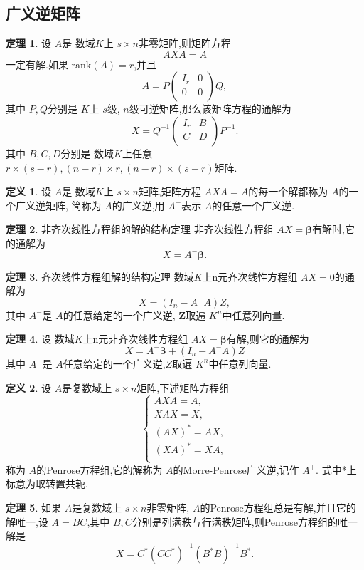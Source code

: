 \documentclass[a4paper,11pt]{article}%
\theoremstyle{remark}
\theoremstyle{definition}
\newtheorem{theorem}{定理}[section]
\theoremstyle{definition}
\newtheorem*{definition}{定义}
\theoremstyle{plain}
\begin{document}
\subsection{广义逆矩阵}
\begin{theorem}
    设 $A$是 数域$K$上 $s\times n$非零矩阵,则矩阵方程
    \[AXA=A\]
    一定有解.如果 $\text{rank}(A)=r$,并且
    \[A=P\begin{pmatrix}
        I_r&0\\
        0&0\\
    \end{pmatrix}Q,\]
    其中 $P,Q$分别是 $K$上 $s$级, $n$级可逆矩阵,那么该矩阵方程的通解为
    \[X=Q^{-1}\begin{pmatrix}
        I_r&B\\
        C&D\\
    \end{pmatrix}
    P^{-1}.\]
    其中 $B,C,D$分别是 数域$K$上任意 $r\times (s-r),(n-r)\times r,(n-r)\times (s-r)$矩阵.
\end{theorem}
\begin{definition}
    设 $A$是 数域$K$上 $s\times n$矩阵,矩阵方程 $AXA=A$的每一个解都称为 $A$的一个广义逆矩阵,
    简称为 $A$的广义逆,用 $A^-$表示 $A$的任意一个广义逆.
\end{definition}
\begin{theorem}{非齐次线性方程组的解的结构定理}
   非齐次线性方程组 $AX=\bm{\beta}$有解时,它的通解为
   \[X=A^-\bm{\beta}.\] 
\end{theorem}
\begin{theorem}{齐次线性方程组解的结构定理}
    数域$K$上n元齐次线性方程组 $AX=0$的通解为
    \[X=(I_n-A^-A)Z,\]
    其中 $A^-$是 $A$的任意给定的一个广义逆, $\mathbf{Z}$取遍 $K^n$中任意列向量.
\end{theorem}
\begin{theorem}
    设 数域$K$上n元非齐次线性方程组 $AX=\bm{\beta}$有解,则它的通解为
    \[X=A^-\bm{\beta}+(I_n-A^-A)Z\]
    其中 $A^-$是 $A$任意给定的一个广义逆,$Z$取遍 $K^n$中任意列向量.
\end{theorem}
\begin{definition}
    设 $A$是复数域上 $s\times n$矩阵,下述矩阵方程组
    \[
    \begin{cases}
        AXA=A,\\
        XAX=X,\\
        (AX)^*=AX,\\
        (XA)^*=XA,\\
    \end{cases}
    \]
    称为 $A$的Penrose方程组,它的解称为 $A$的Morre-Penrose广义逆,记作 $A^+$.
    式中*上标意为取转置共轭.
\end{definition}
\begin{theorem}
    如果 $A$是复数域上 $s\times n$非零矩阵, $A$的Penrose方程组总是有解,并且它的
    解唯一,设 $A=BC$,其中 $B,C$分别是列满秩与行满秩矩阵,则Penrose方程组的唯一解是
    \[X=C^*(CC^*)^{-1}(B^*B)^{-1}B^*.\]
\end{theorem}
\end{document}
